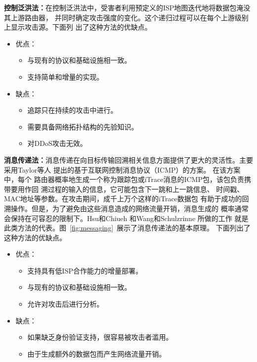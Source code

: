 \textbf{控制泛洪法：}在控制泛洪法中，受害者利用预定义的ISP地图迭代地将数据包淹没其上游路由器，
并同时确定攻击强度的变化。这个递归过程可以在每个上游级别上显示攻击源。下面列
出了这种方法的优缺点。
\begin{itemize}
  \item 优点：
    \begin{itemize}
      \item 与现有的协议和基础设施相一致。
      \item 支持简单和增量的实现。
    \end{itemize}
  \item 缺点：
    \begin{itemize}
      \item 追踪只在持续的攻击中进行。
      \item 需要具备网络拓扑结构的先验知识。
      \item 对DDoS攻击无效。
    \end{itemize}
\end{itemize}

\textbf{消息传递法：}消息传递在向目标传输回溯相关信息方面提供了更大的灵活性。主要采用Taylor等人
提出的基于互联网控制消息协议（ICMP）的方案\cite{Taylor2014ICMP}。
在该方案中，每个
路由器概率地生成一个称为跟踪包或iTrace消息的ICMP包，该包负责携带要用作回
溯过程的输入的信息，它可能包含下一跳和上一跳信息、
时间戳、MAC地址等参数。在攻击期间，成千上万个这样的iTrace数据包
有助于成功的回溯操作。但是，为了避免由这些消息造成的网络流量开销，消息生成的
概率通常会保持在可容忍的限制下。Hsu和Chiueh
\cite{Hsu2003TrafficSourceIdentification}和Wang和Schulzrinne
\cite{WangSchulzrinne2004DoS,WangSchulzrinne2004ReflectiveDoS}所做的工作
就是此类方法的代表。图~\ref{fig:messaging}~展示了消息传递法的基本原理。
下面列出了这种方法的优缺点。
\begin{itemize}
  \item 优点：
    \begin{itemize}
      \item 支持具有低ISP合作能力的增量部署。
      \item 与现有的协议和基础设施相一致。
      \item 允许对攻击后进行分析。
    \end{itemize}
  
  \item 缺点：
    \begin{itemize}
      \item 如果缺乏身份验证支持，很容易被攻击者滥用。
      \item 由于生成额外的数据包而产生网络流量开销。
    \end{itemize}

\end{itemize}

